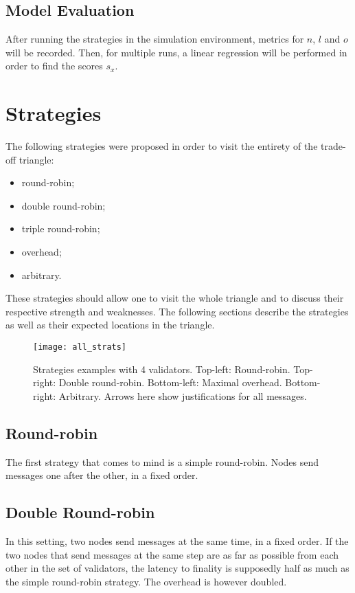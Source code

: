 \subsection{Model Evaluation}
After running the strategies in the simulation environment, metrics for \(n\),
\(l\) and \(o\) will be recorded. Then, for multiple runs, a linear regression
will be performed in order to find the scores \(s_x\).

\section{Strategies}
\label{sec:strategies}

The following strategies were proposed in order to visit the entirety of the
trade-off triangle:
\begin{itemize}
        \item round-robin;
        \item double round-robin;
        \item triple round-robin;
        \item overhead;
        \item arbitrary.
\end{itemize}
These strategies should allow one to visit the whole triangle and to discuss
their respective strength and weaknesses. The following sections describe the
strategies as well as their expected locations in the triangle.

\begin{figure}[h]
	\centering
	\texttt{[image: all\_strats]}
  \captionsetup{justification=centering}
    \caption{Strategies examples with 4 validators. Top-left: Round-robin.
    Top-right: Double round-robin. Bottom-left: Maximal overhead. Bottom-right:
    Arbitrary. Arrows here show justifications for all messages.}
	\label{fig:allStrats}
\end{figure}

\subsection{Round-robin}
The first strategy that comes to mind is a simple round-robin. Nodes send
messages one after the other, in a fixed order.


\subsection{Double Round-robin}
In this setting, two nodes send messages at the same time, in a fixed order. If
the two nodes that send messages at the same step are as far as possible from each
other in the set of validators, the latency to finality is supposedly
half as much as the simple round-robin strategy. The overhead is however
doubled.

